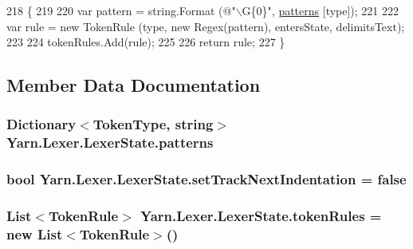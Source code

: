 \begin{DoxyCode}
218                                                                                                            
            \{
219 
220                 var pattern = string.Format (\textcolor{stringliteral}{@"\(\backslash\)G\{0\}"}, \hyperlink{a00062_a951f91e9522ffe84851f2e25e9445106}{patterns} [type]);
221 
222                 var rule = \textcolor{keyword}{new} TokenRule (type, \textcolor{keyword}{new} Regex(pattern), entersState, delimitsText);
223 
224                 tokenRules.Add(rule);
225 
226                 \textcolor{keywordflow}{return} rule;
227             \}
\end{DoxyCode}


\subsection{Member Data Documentation}
\hypertarget{a00062_a951f91e9522ffe84851f2e25e9445106}{
\subsubsection[{patterns}]{\setlength{\rightskip}{0pt plus 5cm}Dictionary$<${\bf Token\-Type}, string$>$ Yarn.\-Lexer.\-Lexer\-State.\-patterns\hspace{0.3cm}{\ttfamily [private]}}}\label{a00062_a951f91e9522ffe84851f2e25e9445106}
\hypertarget{a00062_ad8b6ccac53bedd9dc202ffe6ac5698b2}{
\subsubsection[{set\-Track\-Next\-Indentation}]{\setlength{\rightskip}{0pt plus 5cm}bool Yarn.\-Lexer.\-Lexer\-State.\-set\-Track\-Next\-Indentation = false}}\label{a00062_ad8b6ccac53bedd9dc202ffe6ac5698b2}
\hypertarget{a00062_adf6563b1dc6f3ef80ed13c2b15b7be03}{
\subsubsection[{token\-Rules}]{\setlength{\rightskip}{0pt plus 5cm}List$<${\bf Token\-Rule}$>$ Yarn.\-Lexer.\-Lexer\-State.\-token\-Rules = new List$<${\bf Token\-Rule}$>$()}}\label{a00062_adf6563b1dc6f3ef80ed13c2b15b7be03}


